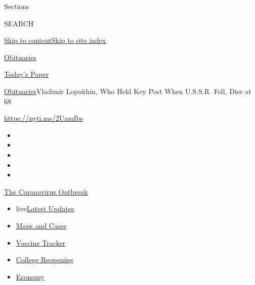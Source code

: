 Sections

SEARCH

\protect\hyperlink{site-content}{Skip to
content}\protect\hyperlink{site-index}{Skip to site index}

\href{https://www.nytimes.com/section/obituaries}{Obituaries}

\href{https://myaccount.nytimes.com/auth/login?response_type=cookie\&client_id=vi}{}

\href{https://www.nytimes.com/section/todayspaper}{Today's Paper}

\href{/section/obituaries}{Obituaries}\textbar{}Vladimir Lopukhin, Who
Held Key Post When U.S.S.R. Fell, Dies at 68

\url{https://nyti.ms/2UamIbs}

\begin{itemize}
\item
\item
\item
\item
\item
\end{itemize}

\href{https://www.nytimes.com/news-event/coronavirus?action=click\&pgtype=Article\&state=default\&region=TOP_BANNER\&context=storylines_menu}{The
Coronavirus Outbreak}

\begin{itemize}
\tightlist
\item
  live\href{https://www.nytimes.com/2020/08/03/world/coronavirus-covid-19.html?action=click\&pgtype=Article\&state=default\&region=TOP_BANNER\&context=storylines_menu}{Latest
  Updates}
\item
  \href{https://www.nytimes.com/interactive/2020/us/coronavirus-us-cases.html?action=click\&pgtype=Article\&state=default\&region=TOP_BANNER\&context=storylines_menu}{Maps
  and Cases}
\item
  \href{https://www.nytimes.com/interactive/2020/science/coronavirus-vaccine-tracker.html?action=click\&pgtype=Article\&state=default\&region=TOP_BANNER\&context=storylines_menu}{Vaccine
  Tracker}
\item
  \href{https://www.nytimes.com/2020/08/02/us/covid-college-reopening.html?action=click\&pgtype=Article\&state=default\&region=TOP_BANNER\&context=storylines_menu}{College
  Reopening}
\item
  \href{https://www.nytimes.com/live/2020/08/03/business/stock-market-today-coronavirus?action=click\&pgtype=Article\&state=default\&region=TOP_BANNER\&context=storylines_menu}{Economy}
\end{itemize}

